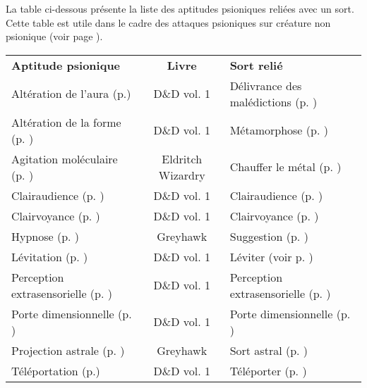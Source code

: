 La table ci-dessous présente la liste des aptitudes psioniques reliées avec un sort. Cette table est utile dans le cadre des attaques psioniques sur créature non psionique (voir page \pageref{custom-attaque-non-psionique}).

\bigskip

\begin{tabular}{lcl}
\textbf{Aptitude psionique}                                     & \textbf{Livre}    & \textbf{Sort relié} \\
Altération de l'aura (p.\pageref{clerc-alteration-aura})        & D\&D vol. 1       & Délivrance des malédictions (p. \pageref{sort-delivrance-malediction}) \\
Altération de la forme (p. \pageref{magicien-alteration-forme}) & D\&D vol. 1       & Métamorphose (p. \pageref{sort-metamorphose}) \\
Agitation moléculaire (p. \pageref{magicien-agitation-mol})     & Eldritch Wizardry & Chauffer le métal (p. \pageref{sort-chauffe-metal}) \\
Clairaudience (p. \pageref{guerrier-clairaudience})             & D\&D vol. 1       & Clairaudience (p. \pageref{sort-clairaudience}) \\
Clairvoyance (p. \pageref{guerrier-clairvoyance})               & D\&D vol. 1       & Clairvoyance (p. \pageref{sort-clairvoyance}) \\
Hypnose (p. \pageref{magicien-hypnose})                         & Greyhawk          & Suggestion (p. \pageref{sort-suggestion}) \\
Lévitation (p. \pageref{guerrier-levitation})                   & D\&D vol. 1       & Léviter (voir p. \pageref{sort-levitation}) \\
Perception extrasensorielle (p. \pageref{magicien-ESP})         & D\&D vol. 1       & Perception extrasensorielle (p. \pageref{sort-esp}) \\
Porte dimensionnelle (p. \pageref{magicien-porte-dimensionnelle}) & D\&D vol. 1     & Porte dimensionnelle (p. \pageref{sort-porte-dimensionnelle}) \\
Projection astrale (p. \pageref{guerrier-projection-astrale})   & Greyhawk          & Sort astral (p. \pageref{sort-astral}) \\
Téléportation (p.\pageref{magicien-teleportation})              & D\&D vol. 1       & Téléporter (p. \pageref{sort-teleporter}) \\
\end{tabular}

\bigskip

